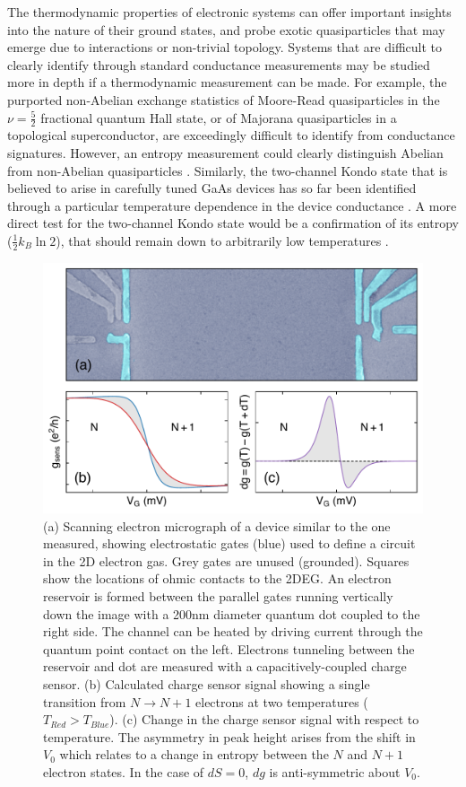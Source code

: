 \documentclass[preprint,showpacs,preprintnumbers,amsmath,amssymb,pra,aps,superscriptaddress]{revtex4-1}
\begin{document}
The thermodynamic properties of electronic systems can offer important insights into the nature of their ground states, and probe exotic quasiparticles that may emerge due to interactions or non-trivial topology.  Systems that are difficult to clearly identify through standard conductance measurements may be studied more in depth if a thermodynamic measurement can be made. For example, the purported non-Abelian exchange statistics of Moore-Read quasiparticles in the $\nu = \frac{5}{2}$ fractional quantum Hall state, or of Majorana quasiparticles in a topological superconductor, are exceedingly difficult to identify from conductance signatures. However, an entropy measurement could clearly distinguish Abelian from non-Abelian quasiparticles \cite{Cooper2009, Smirnov2015}.  Similarly, the two-channel Kondo state that is believed to arise in carefully tuned GaAs devices has so far been identified through a particular temperature dependence in the device conductance \cite{Potok2007}. A more direct test for the two-channel Kondo state would be a confirmation of its entropy ($\frac{1}{2} k_B \ln{2}$), that should remain down to arbitrarily low temperatures \cite{Alkurtass2016}.

\begin{figure}[!]
        \includegraphics[width=1.0\columnwidth]{../figures/figure_1_no-annotation.pdf}
        \caption{\label{fig:fig1}(a) Scanning electron micrograph of a device similar to the one measured, showing electrostatic gates (blue) used to define a circuit in the 2D electron gas. Grey gates are unused (grounded). Squares show the locations of ohmic contacts to the 2DEG. An electron reservoir is formed between the parallel gates running vertically down the image with a 200nm diameter quantum dot coupled to the right side. The channel can be heated by driving current through the quantum point contact on the left. Electrons tunneling between the reservoir and dot are measured with a capacitively-coupled charge sensor. (b) Calculated charge sensor signal showing a single transition from $N \rightarrow N+1$ electrons at two temperatures ($T_{Red} > T_{Blue}$). (c) Change in the charge sensor signal with respect to temperature. The asymmetry in peak height arises from the shift in $V_0$ which relates to a change in entropy between the $N$ and $N+1$ electron states. In the case of $dS=0$, $dg$ is anti-symmetric about $V_0$.}
\end{figure}
\end{document}
